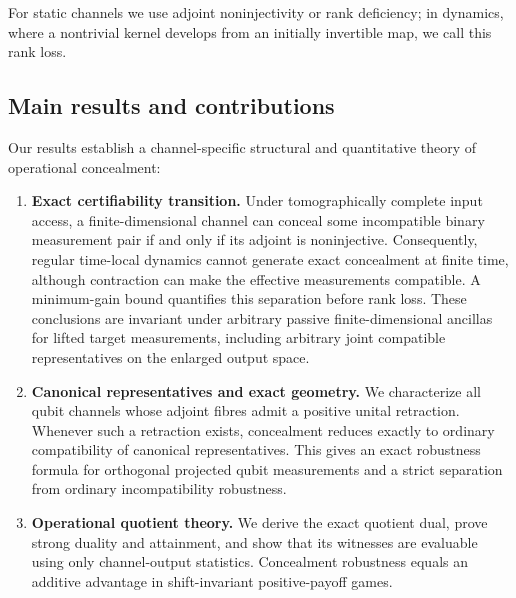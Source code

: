 \documentclass[
aps,pra,twocolumn,10pt,
superscriptaddress,longbibliography,floatfix
]{revtex4-2}
\begin{document}
For static channels we use adjoint noninjectivity or rank deficiency; in dynamics, where a nontrivial kernel develops from an initially invertible map, we call this rank loss.

\subsection{Main results and contributions}

Our results establish a channel-specific structural and quantitative theory of operational concealment:

\begin{enumerate}
\item \textbf{Exact certifiability transition.}
Under tomographically complete input access, a finite-dimensional channel can conceal some incompatible binary measurement pair if and only if its adjoint is noninjective. Consequently, regular time-local dynamics cannot generate exact concealment at finite time, although contraction can make the effective measurements compatible. A minimum-gain bound quantifies this separation before rank loss. These conclusions are invariant under arbitrary passive finite-dimensional ancillas for lifted target measurements, including arbitrary joint compatible representatives on the enlarged output space.

\item \textbf{Canonical representatives and exact geometry.}
We characterize all qubit channels whose adjoint fibres admit a positive unital retraction. Whenever such a retraction exists, concealment reduces exactly to ordinary compatibility of canonical representatives. This gives an exact robustness formula for orthogonal projected qubit measurements and a strict separation from ordinary incompatibility robustness.

\item \textbf{Operational quotient theory.}
We derive the exact quotient dual, prove strong duality and attainment, and show that its witnesses are evaluable using only channel-output statistics. Concealment robustness equals an additive advantage in shift-invariant positive-payoff games.
\end{enumerate}
\end{document}
